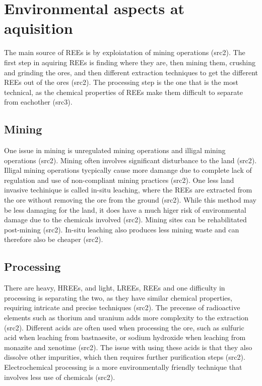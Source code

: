 
\section{Environmental aspects at aquisition}

The main source of REEs is by exploiatation of mining operations (src2). The first step in aquiring REEs is finding where they are, then mining them, crushing and grinding the ores, and then different extraction techniques to get the different REEs out of the ores (src2). The processing step is the one that is the most technical, as the chemical properties of REEs make them difficult to separate from eachother (src3).


\subsection{Mining}

One issue in mining is unregulated mining operations and illigal mining operations (src2). Mining often involves significant disturbance to the land (src2). Illigal mining operations tycpically cause more damange due to complete lack of regulation and use of non-compliant mining practices (src2). One less land invasive techinique is called in-situ leaching, where the REEs are extracted from the ore without removing the ore from the ground (src2). While this method may be less damaging for the land, it does have a much higer risk of environmental damage due to the chemicals involved (src2). Mining sites can be rehabilitated post-mining (src2). In-situ leaching also produces less mining waste and can therefore also be cheaper (src2).

\subsection{Processing}

There are heavy, HREEs, and light, LREEs, REEs and one difficulty in processing is separating the two, as they have similar chemical properties, requiring intricate and precise techniques (src2). The precense of radioactive elements such as thorium and uranium adds more complexity to the extraction (src2). Different acids are often used when processing the ore, such as sulfuric acid when leaching from bastnaesite, or sodium hydroxide when leaching from monazite and xenotime (src2). The issue with using these acids is that they also dissolve other impurities, which then requires further purification steps (src2). Electrochemical processing is a more environmentally friendly technique that involves less use of chemicals (src2).

